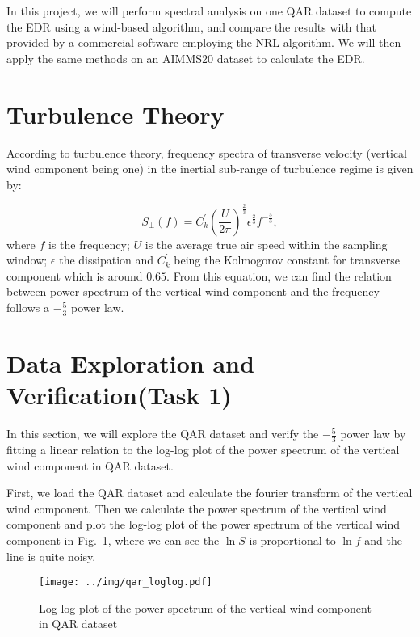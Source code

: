 \documentclass[runningheads]{llncs}
\begin{document}
In this project, we will perform spectral analysis on one QAR dataset to compute the EDR using a wind-based algorithm, and compare the results with that provided by a commercial software employing the NRL algorithm. 
We will then apply the same methods on an AIMMS20 dataset to calculate the EDR.

\section{Turbulence Theory}

According to turbulence theory, frequency spectra of transverse velocity (vertical wind component being one) in the inertial sub-range of turbulence regime is given by:

\begin{equation}
    S_{\perp}(f)=C_k^{'}\left(\frac{U}{2\pi}\right)^{\frac23}\epsilon^{\frac23}f^{-\frac53},
\end{equation}
where $f$ is the frequency; $U$ is the average true air speed within the sampling window; $\epsilon$ the dissipation and $C^{'}_k$ being the Kolmogorov constant for transverse
component which is around $0.65$. From this equation, we can find the relation between power spectrum of the vertical wind component and the frequency follows a $-\frac53$ power law.

\section{Data Exploration and Verification(Task 1)}

In this section, we will explore the QAR dataset and verify the $-\frac53$ power law by fitting a linear relation to the log-log plot of the power spectrum of the vertical wind component in QAR dataset.

First, we load the QAR dataset and calculate the fourier transform of the vertical wind component. 
Then we calculate the power spectrum of the vertical wind component 
and plot the log-log plot of the power spectrum of the vertical wind component in Fig.~\ref{fig:qar_loglog},
where we can see the $\ln{S}$ is proportional to $\ln{f}$ and the line is quite noisy.

\begin{figure}[!htbp]
    \centering
    \texttt{[image: ../img/qar\_loglog.pdf]}
    \caption{Log-log plot of the power spectrum of the vertical wind component in QAR dataset}
    \label{fig:qar_loglog}
\end{figure}
\end{document}
